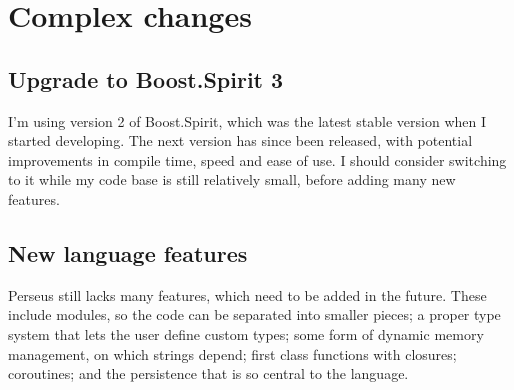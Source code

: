 	\section{Complex changes}
		
		\subsection{Upgrade to Boost.Spirit 3}
		
		I'm using version 2 of Boost.Spirit, which was the latest stable version when I started developing. The next version has since been released, with potential improvements in compile time, speed and ease of use. I should consider switching to it while my code base is still relatively small, before adding many new features.
		
		\subsection{New language features}
		
		Perseus still lacks many features, which need to be added in the future. These include modules, so the code can be separated into smaller pieces; a proper type system that lets the user define custom types; some form of dynamic memory management, on which strings depend; first class functions with closures; coroutines; and the persistence that is so central to the language.
